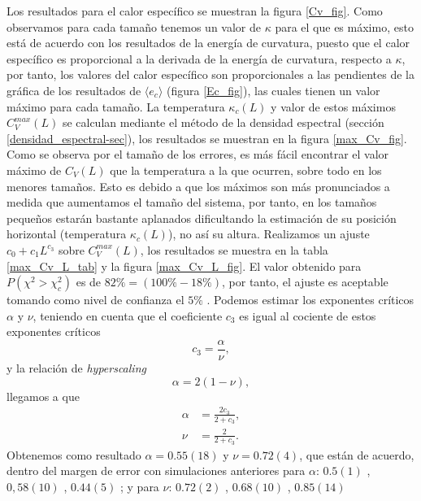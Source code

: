 Los resultados para el calor específico se muestran la figura
\ref{Cv_fig}. Como observamos para cada tamaño tenemos un valor de $\kappa$
para el que es máximo, esto está de acuerdo con los resultados de la energía
de curvatura, puesto que el calor específico es proporcional a la derivada de
la energía de curvatura, respecto a $\kappa$, por tanto, los valores del calor
específico son proporcionales a las pendientes de la gráfica de los resultados
de $\langle e_c\rangle$ (figura \ref{Ec_fig}), las cuales tienen un valor
máximo para cada tamaño. La temperatura $\kappa_c(L)$ y valor de estos máximos
$C_V^{max}(L)$ se calculan mediante el método de la densidad espectral (sección
\ref{densidad_espectral-sec}), los resultados se muestran en la figura \ref{max_Cv_fig}. Como se
observa por el tamaño de los errores, es más fácil encontrar el valor máximo
de $C_V(L)$ que la temperatura a la que ocurren, sobre todo en los menores
tamaños. Esto es debido a que los máximos son más pronunciados a medida que
aumentamos el tamaño del sistema, por tanto, en los tamaños pequeños estarán
bastante aplanados dificultando la estimación de su posición horizontal
(temperatura $\kappa_c(L)$), no así su altura. Realizamos un ajuste
$c_0+c_1L^{c_3}$ sobre $C_V^{max}(L)$, los resultados se muestra en la tabla
\ref{max_Cv_L_tab} y la figura \ref{max_Cv_L_fig}. El valor obtenido para $P(\chi^2>\chi_c^2)$ es de
$82\%=(100\%-18\%)$, por tanto, el ajuste es aceptable tomando como nivel de
confianza el $5\%$  . Podemos estimar los exponentes críticos $\alpha$ y $\nu$,
teniendo en cuenta que el coeficiente $c_3$ es igual al cociente de estos exponentes
críticos
\begin{equation*}
 c_3=\frac{\alpha}{\nu},
\end{equation*}
y la relación de \textit{hyperscaling} \cite{Cardy}
\begin{equation*}
\alpha=2(1-\nu),
\end{equation*}
llegamos a que
\begin{align*}
\alpha&=\frac{2c_3}{2+c_3},\\
\nu&=\frac{2}{2+c_3}.
\end{align*}
Obtenemos como resultado $\alpha=0.55(18)$ y $\nu=0.72(4)$, que están de
acuerdo, dentro del margen de error con simulaciones anteriores para $\alpha$: $0.5(1)$
\cite{Bowick_flat_phase}, $0,58(10)$ \cite{Wheater_Critical_exponents},
$0.44(5)$ \cite{Renken_Scaling_behavior}; y para $\nu$: $0.72(2)$
\cite{Renken_Scaling_behavior}, $0.68(10)$ \cite{Wheater_Critical_exponents},
$0.85(14)$ \cite{Espriu:MCRG}

